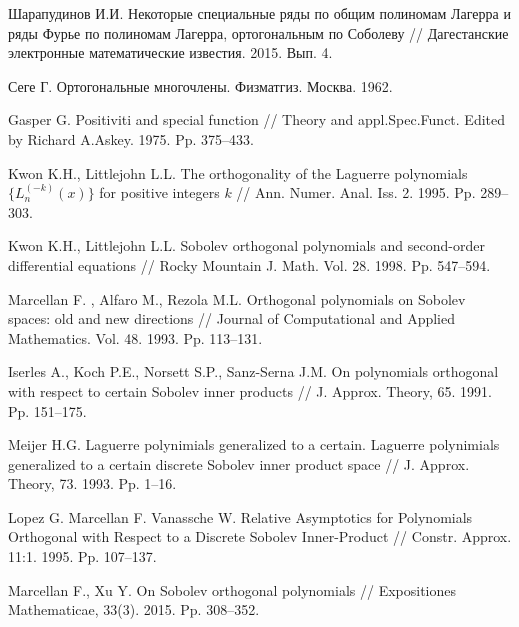 \begin{thebibliography}{20}
{Шарапудинов И.И.}
Некоторые специальные ряды по общим полиномам Лагерра и ряды Фурье по полиномам Лагерра, ортогональным по Соболеву
// Дагестанские электронные математические известия. 2015. Вып. 4.



{Сеге Г.} Ортогональные многочлены. Физматгиз. Москва. 1962.



{Gasper G.}
Positiviti and special function
// Theory and appl.Spec.Funct. Edited by Richard A.Askey. 1975. Pp. 375--433.



{Kwon K.H., Littlejohn L.L.}
The orthogonality of the Laguerre polynomials $\{L_n^{(-k)}(x)\}$ for positive integers $k$
// Ann. Numer. Anal. Iss. 2. 1995. Pp. 289--303.



{Kwon K.H., Littlejohn L.L.}
Sobolev orthogonal polynomials and second-order differential equations
// Rocky Mountain J. Math. Vol. 28. 1998. Pp. 547--594.



{Marcellan F. , Alfaro M., Rezola M.L.} Orthogonal polynomials on Sobolev spaces: old and new directions
// Journal of Computational and Applied Mathematics. Vol. 48. 1993. Pp. 113--131.



{ Iserles A., Koch P.E., Norsett S.P., Sanz-Serna J.M.}
On polynomials  orthogonal  with respect  to certain Sobolev inner products
// J. Approx. Theory, 65. 1991. Pp. 151--175.



{Meijer H.G.} Laguerre polynimials generalized to a certain.
Laguerre polynimials generalized to a certain discrete Sobolev inner product space
// J. Approx. Theory, 73. 1993. Pp. 1--16.



{Lopez G. Marcellan F. Vanassche W.}
Relative Asymptotics for Polynomials Orthogonal with Respect to a Discrete Sobolev Inner-Product
// Constr. Approx. 11:1. 1995. Pp. 107--137.



{Marcellan F., Xu Y.}
On Sobolev orthogonal polynomials
// Expositiones Mathematicae, 33(3). 2015. Pp. 308--352.




\end{thebibliography}

